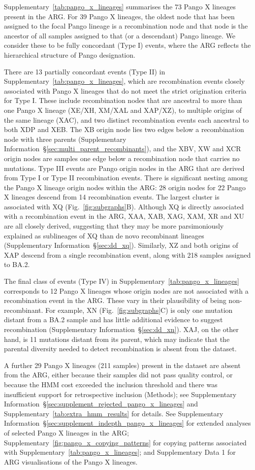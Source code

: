 \documentclass[12pt]{article}
\newcommand{\supref}[1]{Supplementary Information~\S\ref{#1}}
\newcommand{\figref}[1]{Fig.~\ref{#1}}
\newcommand{\siref}[1]{Supplementary~\ref{#1}}
\begin{document}
\siref{tab:pango_x_lineages} summarises
the 73 Pango X lineages present in the ARG.
For 39 Pango X lineages, the oldest node
that has been assigned to the focal Pango lineage is a recombination node and
that node is the ancestor of all samples
assigned to that (or a descendant) Pango lineage.
We consider these to be fully concordant (Type I) events,
where the ARG reflects the
hierarchical structure of Pango designation.

There are 13 partially concordant events (Type II)
in \siref{tab:pango_x_lineages}, which
are recombination events closely associated with Pango X lineages
that do not meet the strict origination criteria for Type I.
These include recombination nodes that are ancestral to more than one
Pango X lineage (XE/XH, XM/XAL and XAP/XZ),
to multiple origins of the same lineage (XAC),
and two distinct recombination events each ancestral to both XDP and XEB.
The XB origin node lies two edges below a recombination node
with three parents (\supref{sec:multi_parent_recombinants}),
and the XBV, XW and XCR origin nodes are samples one edge below
a recombination node that carries no mutations.
Type III events are Pango origin nodes in the ARG that are
derived from Type I or Type II recombination events.
There is significant
nesting among the Pango X lineage origin nodes within the ARG:
28 origin nodes for 22 Pango X lineages descend from
14 recombination events.
The largest cluster is associated with XQ
(\figref{fig:subgraphs}B). Although XQ is
directly associated with a recombination event in the ARG,
XAA, XAB, XAG, XAM, XR and XU are all closely derived, suggesting
that they may be more parsimoniously explained as sublineages of XQ
than de novo recombinant lineages (\supref{sec:dd_xq}).
Similarly, XZ and both origins of XAP descend from a single
recombination event, along with 218 samples assigned to BA.2.

The final class of events (Type IV) in \siref{tab:pango_x_lineages}
corresponds to 12 Pango X lineages whose origin nodes are not associated
with a recombination event in the ARG.
These vary in their plausibility of being non-recombinant.
For example, XN (\figref{fig:subgraphs}C) is only one mutation
distant from a BA.2 sample and has little additional evidence
to suggest recombination (\supref{sec:dd_xn}).
XAJ, on the other hand, is 11 mutations distant from its parent,
which may indicate that the parental diversity
needed to detect recombination is absent from the dataset.

A further 29 Pango X lineages (211 samples) present in the dataset
are absent from the ARG,
either because their samples did not pass quality control,
or because the HMM cost exceeded the inclusion threshold
and there was insufficient support for retrospective inclusion (Methods);
see \supref{sec:supplement_rejected_pango_x_lineages} and \siref{tab:extra_hmm_results} for details.
See \supref{sec:supplement_indepth_pango_x_lineages}
for extended analyses of selected Pango X lineages in the ARG;
\siref{fig:pango_x_copying_patterns} for copying patterns
associated with \siref{tab:pango_x_lineages};
and Supplementary Data 1 for ARG visualisations of the Pango X lineages.
\end{document}
